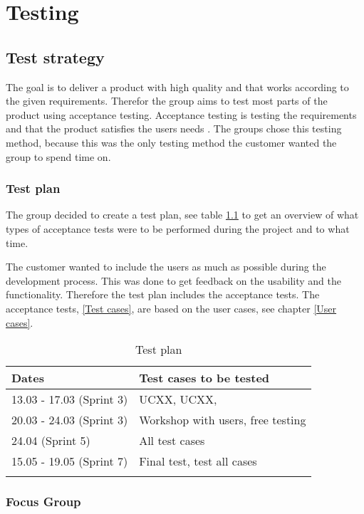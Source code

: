 
\chapter{Testing}

\section{Test strategy}
The goal is to deliver a product with high quality and that works according to the given requirements. Therefor the group aims to test most parts of the product using acceptance testing. Acceptance testing is testing the requirements and that the product satisfies the users needs \cite{acceptanceTesting}. The groups chose this testing method, because this was the only testing method the customer wanted the group to spend time on.

\subsection{Test plan}
The group decided to create a test plan, see table \ref{Test plan}  to get an overview of what types of acceptance tests were to be performed during the project and to what time.

The customer wanted to include the users as much as possible during the development process. This was done to get feedback on the usability and the functionality. Therefore the test plan includes the acceptance tests. The acceptance tests, \ref{Test cases}, are based on the user cases, see chapter \ref{User cases}.

\begin{longtable}{|l|l|}
\hline
\rowcolor{Gray}
\textbf{Dates} & \textbf{Test cases to be tested} \\
\hline
13.03 - 17.03 (Sprint 3) & UCXX, UCXX,   \\
\hline
20.03 - 24.03 (Sprint 3) & Workshop with users, free testing\\
\hline
24.04 (Sprint 5) & All test cases \\
\hline
15.05 - 19.05 (Sprint 7) & Final test, test all cases  \\
\hline
\caption{Test plan}
\label{Test plan}
\end{longtable}


\subsection{Focus Group}

